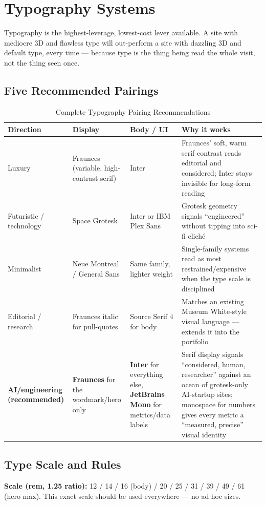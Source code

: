 \documentclass[conference]{IEEEtran}
\begin{document}
\section{Typography Systems}

Typography is the highest-leverage, lowest-cost lever available. A site with mediocre 3D and flawless type will out-perform a site with dazzling 3D and default type, every time --- because type is the thing being read the whole visit, not the thing seen once.

\subsection{Five Recommended Pairings}
\begin{table}[t]
\centering
\caption{Complete Typography Pairing Recommendations}
\label{tab:type_full}
\begin{tabular}{L{2.0cm}L{2.8cm}L{2.8cm}L{9.0cm}}
\toprule
\textbf{Direction} & \textbf{Display} & \textbf{Body / UI} & \textbf{Why it works} \\
\midrule
Luxury & Fraunces (variable, high-contrast serif) & Inter & Fraunces' soft, warm serif contrast reads editorial and considered; Inter stays invisible for long-form reading \\
Futuristic / technology & Space Grotesk & Inter or IBM Plex Sans & Grotesk geometry signals ``engineered'' without tipping into sci-fi clich\'e \\
Minimalist & Neue Montreal / General Sans & Same family, lighter weight & Single-family systems read as most restrained/expensive when the type scale is disciplined \\
Editorial / research & Fraunces italic for pull-quotes & Source Serif 4 for body & Matches an existing Museum White-style visual language --- extends it into the portfolio \\
\textbf{AI/engineering (recommended)} & \textbf{Fraunces} for the wordmark/hero only & \textbf{Inter} for everything else, \textbf{JetBrains Mono} for metrics/data labels & Serif display signals ``considered, human, researcher'' against an ocean of grotesk-only AI-startup sites; monospace for numbers gives every metric a ``measured, precise'' visual identity \\
\bottomrule
\end{tabular}
\end{table}

\subsection{Type Scale and Rules}
\textbf{Scale (rem, 1.25 ratio):} 12 / 14 / 16 (body) / 20 / 25 / 31 / 39 / 49 / 61 (hero max). This exact scale should be used everywhere --- no ad hoc sizes.
\end{document}
